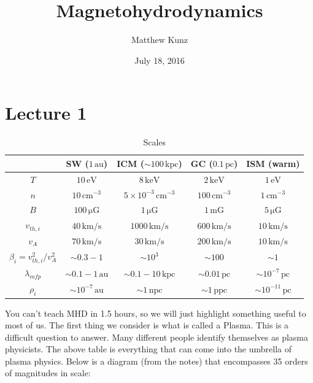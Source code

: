 \documentclass[letterpaper, 11pt]{article}
\numberwithin{equation}{section}
\numberwithin{figure}{section}
\begin{document}
\title{Magnetohydrodynamics}
\author{Matthew Kunz}
\date{July 18, 2016}

\maketitle

\section{Lecture 1}
\label{sec:lec1}

\begin{table}[h]
  \centering
  \begin{tabular}{|c|c|c|c|c|}
    \hline
    & SW ($1\,\mathrm{au}$) & ICM  ($\sim 100\,\mathrm{kpc}$) & GC ($0.1\,\mathrm{pc}$) & ISM (warm) \\ \hline
    $T$ & $10\,\mathrm{eV}$ & $8\,\mathrm{keV}$ & $2\,\mathrm{keV}$ & $1\,\mathrm{eV}$ \\ \hline
    $n$ & $10\,\mathrm{cm^{-3}}$& $5\times 10^{-3}\,\mathrm{cm^{-3}}$& $100\,\mathrm{cm^{-3}}$ & $1\,\mathrm{cm^{-3}}$ \\ \hline
    $B$ & $100\,\mathrm{\mu G}$ & $1\,\mathrm{\mu G}$ & $1\,\mathrm{mG}$ & $5\,\mathrm{\mu G}$ \\ \hline
    $v_{th,i}$ & $40\,\mathrm{km/s}$ & $1000\,\mathrm{km/s}$ & $600\,\mathrm{km/s}$ &  $10\,\mathrm{km/s}$ \\ \hline
    $v_{A}$ & $70\,\mathrm{km/s}$ & $30\,\mathrm{km/s}$ & $200\,\mathrm{km/s}$ & $10\,\mathrm{km/s}$ \\ \hline
    $\beta_i = v_{th,i}^2/v_A^2$ & $\sim 0.3-1$ & $\sim 10^3$ & $\sim 100$ & $\sim 1$ \\ \hline
    $\lambda_{mfp}$ & $\sim 0.1 - 1\,\mathrm{au}$ & $\sim 0.1 - 10\,\mathrm{kpc}$ & $\sim 0.01\,\mathrm{pc}$& $\sim 10^{-7}\,\mathrm{pc}$ \\ \hline
    $\rho_i$ & $\sim 10^{-7}\,\mathrm{au}$ & $\sim 1\,\mathrm{npc}$ & $\sim 1\,\mathrm{ppc}$ & $\sim 10^{-11}\,\mathrm{pc}$ \\ \hline
  \end{tabular}
  \caption{Scales}
  \label{tab:scales}
\end{table}

You can't teach MHD in 1.5 hours, so we will just highlight something useful to
most of us. The first thing we consider is what is called a Plasma. This is a
difficult question to answer. Many different people identify themselves as
plasma physicists. The above table is everything that can come into the umbrella
of plasma physics. Below is a diagram (from the notes) that encompasses 35
orders of magnitudes in scale:
\end{document}
